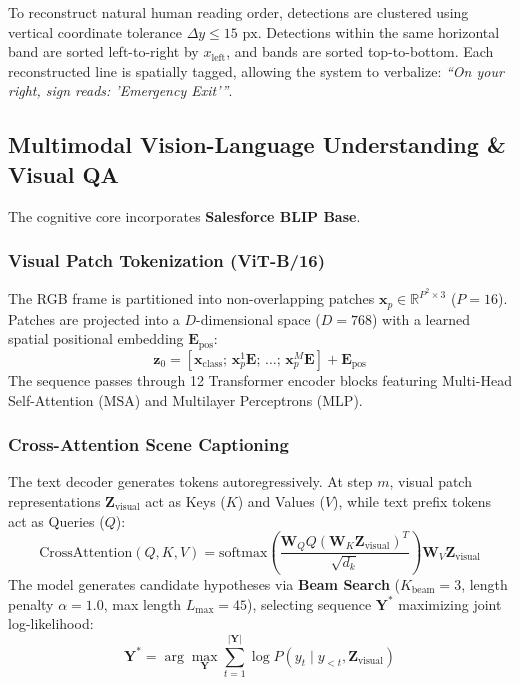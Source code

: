 \documentclass[conference]{IEEEtran}
\begin{document}
To reconstruct natural human reading order, detections are clustered using vertical coordinate tolerance $\Delta y \le 15\text{ px}$. Detections within the same horizontal band are sorted left-to-right by $x_{\text{left}}$, and bands are sorted top-to-bottom. Each reconstructed line is spatially tagged, allowing the system to verbalize: \textit{``On your right, sign reads: 'Emergency Exit'\thinspace''}.

\subsection{Multimodal Vision-Language Understanding \& Visual QA}
The cognitive core incorporates \textbf{Salesforce BLIP Base}.

\subsubsection{Visual Patch Tokenization (ViT-B/16)}
The RGB frame is partitioned into non-overlapping patches $\mathbf{x}_p \in \mathbb{R}^{P^2 \times 3}$ ($P = 16$). Patches are projected into a $D$-dimensional space ($D=768$) with a learned spatial positional embedding $\mathbf{E}_{\text{pos}}$:
\begin{equation}
\mathbf{z}_0 = [\mathbf{x}_{\text{class}}; \, \mathbf{x}_p^1\mathbf{E}; \, \dots; \, \mathbf{x}_p^M\mathbf{E}] + \mathbf{E}_{\text{pos}}
\end{equation}
The sequence passes through 12 Transformer encoder blocks featuring Multi-Head Self-Attention ($\text{MSA}$) and Multilayer Perceptrons ($\text{MLP}$).

\subsubsection{Cross-Attention Scene Captioning}
The text decoder generates tokens autoregressively. At step $m$, visual patch representations $\mathbf{Z}_{\text{visual}}$ act as Keys ($K$) and Values ($V$), while text prefix tokens act as Queries ($Q$):
\begin{equation}
\text{CrossAttention}(Q, K, V) = \text{softmax}\left(\frac{\mathbf{W}_Q Q (\mathbf{W}_K \mathbf{Z}_{\text{visual}})^T}{\sqrt{d_k}}\right) \mathbf{W}_V \mathbf{Z}_{\text{visual}}
\end{equation}
The model generates candidate hypotheses via \textbf{Beam Search} ($K_{\text{beam}} = 3$, length penalty $\alpha = 1.0$, max length $L_{\text{max}} = 45$), selecting sequence $\mathbf{Y}^*$ maximizing joint log-likelihood:
\begin{equation}
\mathbf{Y}^* = \arg\max_{\mathbf{Y}} \sum_{t=1}^{|\mathbf{Y}|} \log P(y_t \mid y_{<t}, \mathbf{Z}_{\text{visual}})
\end{equation}
\end{document}
